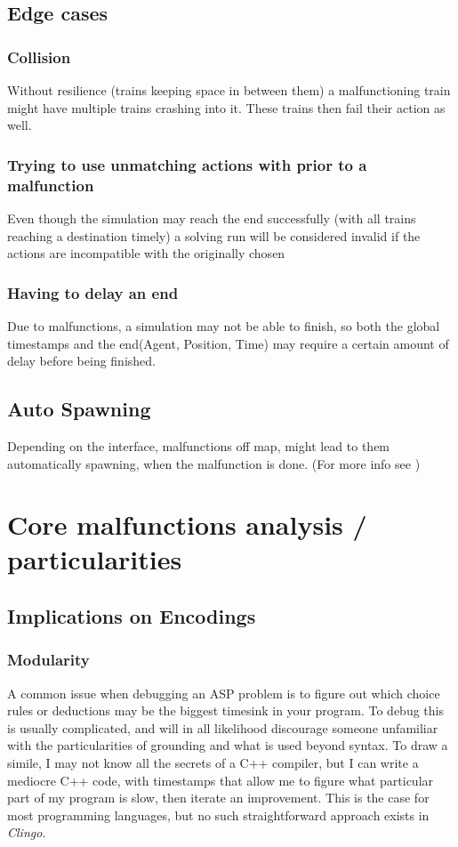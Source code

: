 \subsection{Edge cases}

\subsubsection {Collision} Without resilience (trains keeping space in between them) a malfunctioning train might have multiple trains crashing into it. These trains then fail their action as well.

\subsubsection {Trying to use unmatching actions with prior to a malfunction} Even though the simulation may reach the end successfully (with all trains reaching a destination timely) a solving run will be considered invalid if the actions are incompatible with the originally chosen

\subsubsection {Having to delay an end} Due to malfunctions, a simulation may not be able to finish, so both the global timestamps and the end(Agent, Position, Time) may require a certain amount of delay before being finished.

\subsection {Auto Spawning} Depending on the interface, malfunctions off map, might lead to them automatically spawning, when the malfunction is done. (For more info see \cite{malfunction_issue})

\section{Core malfunctions analysis / particularities}
\subsection{Implications on Encodings}

\subsubsection{Modularity}
A common issue when debugging an ASP problem is to figure out which choice rules or deductions may be the biggest timesink in your program. To debug this is usually complicated, and will in all likelihood discourage someone unfamiliar with the particularities of grounding and what is used beyond syntax. To draw a simile, I may not know all the secrets of a C++ compiler, but I can write a mediocre C++ code, with timestamps that allow me to figure what particular part of my program is slow, then iterate an improvement. This is the case for most programming languages, but no such straightforward approach exists in \textit{Clingo}.


